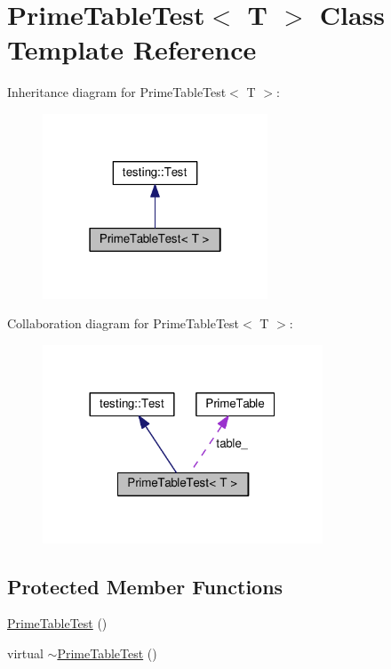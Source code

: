 \hypertarget{classPrimeTableTest}{}\section{Prime\+Table\+Test$<$ T $>$ Class Template Reference}
\label{classPrimeTableTest}


Inheritance diagram for Prime\+Table\+Test$<$ T $>$\+:
\nopagebreak
\begin{figure}[H]
\begin{center}
\leavevmode
\includegraphics[width=190pt]{classPrimeTableTest__inherit__graph}
\end{center}
\end{figure}


Collaboration diagram for Prime\+Table\+Test$<$ T $>$\+:
\nopagebreak
\begin{figure}[H]
\begin{center}
\leavevmode
\includegraphics[width=236pt]{classPrimeTableTest__coll__graph}
\end{center}
\end{figure}
\subsection*{Protected Member Functions}
\begin{DoxyCompactItemize}
\item 
\hyperlink{classPrimeTableTest_ab83d0b24b41bff1ace55f9a8d5ea6dcf}{Prime\+Table\+Test} ()
\item 
virtual \hyperlink{classPrimeTableTest_a4fb27ce277675d58ea3f8db99e3bb2b4}{$\sim$\+Prime\+Table\+Test} ()
\end{DoxyCompactItemize}
